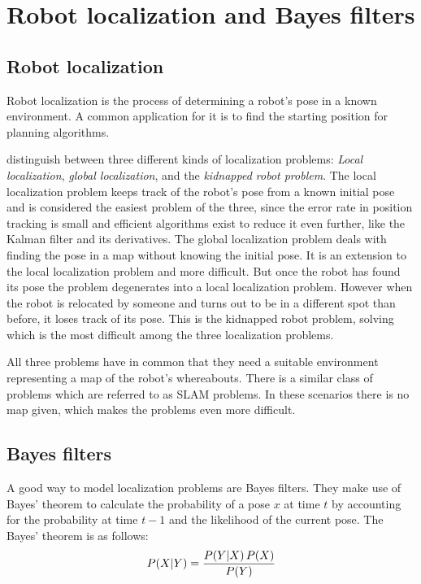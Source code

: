 \documentclass[Thesis.tex]{subfiles}
\begin{document}
\chapter{Robot localization and Bayes filters}

\section{Robot localization}

Robot localization is the process of determining a robot's pose in a known environment. A common application for it is to find the starting position for planning algorithms. 

\citet{ThrunBurgardFox:2005} distinguish between three different kinds of localization problems: \emph{Local localization}, \emph{global localization}, and the \emph{kidnapped robot problem}. The local localization problem keeps track of the robot's pose from a known initial pose and is considered the easiest problem of the three, since the error rate in position tracking is small and efficient algorithms exist to reduce it even further, like the Kalman filter and its derivatives\cite[p.~40ff]{ThrunBurgardFox:2005}. The global localization problem deals with finding the pose in a map without knowing the initial pose. It is an extension to the local localization problem and more difficult. But once the robot has found its pose the problem degenerates into a local localization problem. However when the robot is relocated by someone and turns out to be in a different spot than before, it loses track of its pose. This is the kidnapped robot problem, solving which is the most difficult among the three localization problems.

All three problems have in common that they need a suitable environment representing a map of the robot's whereabouts. There is a similar class of problems which are referred to as \gls{SLAM} problems. In these scenarios there is no map given, which makes the problems even more difficult. 


\section{Bayes filters}
A good way to model localization problems are Bayes filters. They make use of Bayes' theorem to calculate the probability of a pose $x$ at time $t$ by accounting for the probability at time $t-1$ and the likelihood of the current pose. The Bayes' theorem is as follows:
%
\begin{align}
\p[P]{X}{Y} = \frac{ \p[P]{Y}{X} P(X) } { P(Y) }
\end{align}
\end{document}
